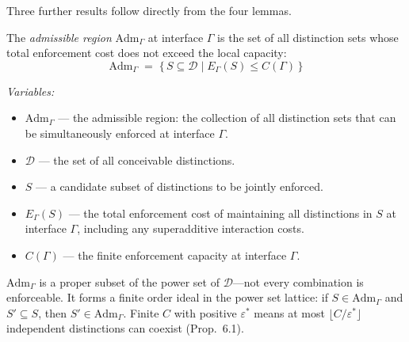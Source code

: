 \documentclass[11pt]{article}
\newcommand{\Adm}{\mathrm{Adm}}
\begin{document}
Three further results follow directly from the four lemmas.

\begin{tcolorbox}[apfbox, title={Definition (Admissibility)}]
The \emph{admissible region} $\Adm_\Gamma$ at interface $\Gamma$ is the set of all distinction sets whose total enforcement cost does not exceed the local capacity:
\begin{equation}
\Adm_\Gamma \;=\; \bigl\{\, S \subseteq \mathcal{D} \;\big|\; E_\Gamma(S) \le C(\Gamma) \,\bigr\}
\end{equation}

\smallskip\noindent\textit{Variables:}
\begin{itemize}[nosep,leftmargin=2em]
\item $\Adm_\Gamma$ --- the admissible region: the collection of all distinction sets that can be simultaneously enforced at interface $\Gamma$.
\item $\mathcal{D}$ --- the set of all conceivable distinctions.
\item $S$ --- a candidate subset of distinctions to be jointly enforced.
\item $E_\Gamma(S)$ --- the total enforcement cost of maintaining all distinctions in $S$ at interface $\Gamma$, including any superadditive interaction costs.
\item $C(\Gamma)$ --- the finite enforcement capacity at interface $\Gamma$.
\end{itemize}

\smallskip\noindent
$\Adm_\Gamma$ is a proper subset of the power set of $\mathcal{D}$---not every combination is enforceable.  It forms a finite order ideal in the power set lattice: if $S \in \Adm_\Gamma$ and $S' \subseteq S$, then $S' \in \Adm_\Gamma$.  Finite $C$ with positive $\varepsilon^*$ means at most $\lfloor C/\varepsilon^* \rfloor$ independent distinctions can coexist (Prop.~6.1).
\end{tcolorbox}
\end{document}
